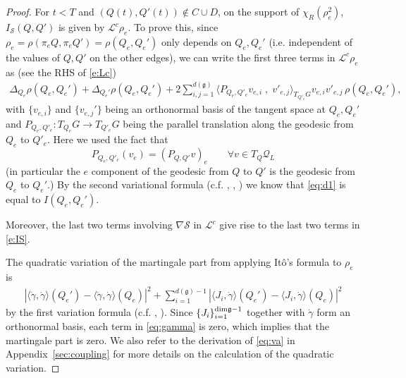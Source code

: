 \documentclass[11pt,UTF-8,reqno]{amsart}
\numberwithin{equation}{section}
\def\<{{\langle}}
\def\>{{\rangle}}
\def\cL{{\mathcal L}}
\def\cQ{{\mathcal Q}}
\def\cS{{\mathcal S}}
\def\<{{\langle}}
\def\>{{\rangle}}
\def\mfg{\mathfrak{g}}
\def\dg{d(\mfg)}
\def\<{\langle} \def\>{\rangle}
\begin{document}
\begin{proof}
 For $t<T$ and $(Q(t), Q'(t))\notin C\cup D$,  on the support of $\chi_R(\rho_e^2)$,
 $I_\cS(Q,Q')$ is given by    $\cL^c \rho_e$. %
To prove this,
since $\rho_e= \rho(\pi_eQ,\pi_eQ')=\rho(Q_e,Q_e')$ only depends on $Q_e, Q_e'$
(i.e. independent of the values of $Q,Q'$ on the other edges),
we can write the first three terms in  $\cL^c \rho_e$  %
as (see the RHS of \eqref{e:Lc})
 \begin{align}\label{eq:d1}
 \Delta_{Q_e}\rho(Q_e,Q_e')
 +\Delta_{Q_e'}\rho(Q_e,Q_e')
 +2\sum_{i,j=1}^{\dg}
    \Big\< P_{Q_e,Q'_e}v_{e,i} \; ,\; v'_{e,j}\Big\>_{T_{Q'_e}G}
     v_{e,i}v'_{e,j} \, \rho(Q_e,Q_e'),
 \end{align}
with $\{v_{e,i}\}$ and $\{v_{e,j}'\}$ being an orthonormal basis
of the tangent space at $Q_e, Q_e'$ and  $P_{Q_e,Q'_e}:T_{Q_e}G\to T_{Q'_e}G$ being the parallel translation along the geodesic from $Q_e$ to $Q'_e$.  Here we used the fact that
$$
P_{Q_e,Q'_e}  (v_e)   %
=
 (P_{Q,Q'}  v)_e
\qquad
\forall v\in T_{Q} \cQ_L
$$
(in particular the $e$ component of the geodesic from $Q$ to $Q'$ is the geodesic from $Q_e$ to $Q_e'$.)
 By the second variational formula  (c.f. \cite[p21-22]{CE75}, \cite[Theorem~2]{Ken86}, \cite[Lemma 6.6.1]{Hsu}) we know that  \eqref{eq:d1} is equal to $I(Q_e,Q_e')$.


Moreover,
the last two terms involving $\nabla \cS$ in $\cL^c$ give rise to the last two terms in \eqref{e:IS}.

The quadratic variation of the martingale part from applying It\^o's formula  to $\rho_e$ is
\begin{align}\label{eq:gamma}
	|\<\dot\gamma,\dot \gamma\>(Q_e')-\<\dot\gamma,\dot \gamma\>(Q_e)|^2+\sum_{i=1}^{\dg-1}|\<J_i,\dot \gamma\>(Q_e')-\<J_i,\dot \gamma\>(Q_e)|^2
\end{align}
by the first variation formula (c.f. \cite[p5]{CE75}, \cite[Section 6.6]{Hsu}).
Since $\{J_i\}_{i=1}^{\rm{dim}\mfg-1}$  together with $\dot\gamma$
form an orthonormal basis, each term in \eqref{eq:gamma} is zero,
which implies that the martingale part is zero. We also refer to the derivation of \eqref{eq:va} in Appendix~\ref{sec:coupling} for more details on the calculation of the quadratic variation.




\end{proof}
\end{document}
